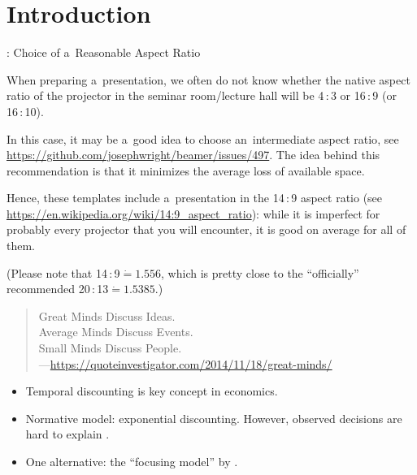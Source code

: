 

\section{Introduction}


\begin{frame}{\titleprefix: Choice of a~Reasonable Aspect Ratio}

	When preparing a~presentation, we often do not know whether the native aspect ratio of the projector in the seminar room/lecture hall will be 4\,:\,3 or 16\,:\,9 (or 16\,:\,10).
	
	In this case, it may be a~good idea to choose an~\alert{intermediate aspect ratio}, see \url{https://github.com/josephwright/beamer/issues/497}. The idea behind this recommendation is that it minimizes the average loss of available space.
	
	Hence, these templates include a~presentation in the \alert{14\,:\,9 aspect ratio} (see \url{https://en.wikipedia.org/wiki/14:9_aspect_ratio}): while it is imperfect for probably every projector that you will encounter, it is good on average for all of them.
	
	(Please note that 14\,:\,9${}\mathrel{\dot{=}} 1.556$, which is pretty close to the ``officially'' recommended 20\,:\,13${}\mathrel{\dot{=}} 1.5385$.)
	
\end{frame}


\begin{frame}{\titleprefix}

	\begin{quote}
		Great Minds Discuss Ideas. \\
		Average Minds Discuss Events. \\
		Small Minds Discuss People. \\
		\upshape ---\url{https://quoteinvestigator.com/2014/11/18/great-minds/}
	\end{quote}

	\begin{itemize}
		\item Temporal discounting is key concept in economics.
		\item Normative model: exponential discounting. However, observed decisions are hard to explain \citep[e.g.,][]{Dohmen2012}.
		\item One alternative: the ``focusing model'' by \cite{Koszegi2013}.
	\end{itemize}

\end{frame}


